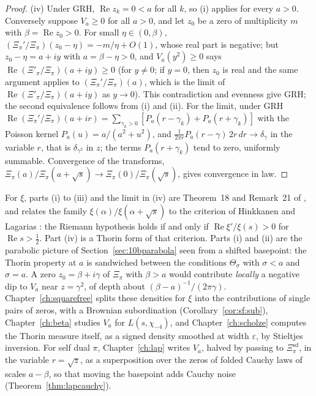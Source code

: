 \begin{proof}
(iv) Under GRH, $\operatorname{Re}z_k = 0<a$ for all $k$, so (i) applies for every $a>0$. Conversely suppose $V_a\ge0$ for all $a>0$, and let $z_0$ be a zero of multiplicity $m$ with $\beta = \operatorname{Re}z_0>0$. For small $\eta\in(0,\beta)$, $(\Xi_\pi'/\Xi_\pi)(z_0-\eta) = -m/\eta+O(1)$, whose real part is negative; but $z_0-\eta = a+iy$ with $a = \beta-\eta>0$, and $V_a(y^2)\ge0$ says $\operatorname{Re}(\Xi'_\pi/\Xi_\pi)(a+iy)\ge0$ (for $y\ne0$; if $y=0$, then $z_0$ is real and the same argument applies to $(\Xi_\pi'/\Xi_\pi)(a)$, which is the limit of $\operatorname{Re}(\Xi'_\pi/\Xi_\pi)(a+iy)$ as $y\to0$). This contradiction and evenness give GRH; the second equivalence follows from (i) and (ii). For the limit, under GRH $\operatorname{Re}(\Xi_\pi'/\Xi_\pi)(a+ir) = \sum_{\gamma_k>0}[P_a(r-\gamma_k)+P_a(r+\gamma_k)]$ with the Poisson kernel $P_a(u) = a/(a^2+u^2)$, and $\frac1{2\pi r}P_a(r-\gamma)\,2r\,dr\to\delta_\gamma$ in the variable $r$, that is $\delta_{\gamma^2}$ in $z$; the terms $P_a(r+\gamma_k)$ tend to zero, uniformly summable. Convergence of the transforms, $\Xi_\pi(a)/\Xi_\pi(a+\sqrt s)\to\Xi_\pi(0)/\Xi_\pi(\sqrt s)$, gives convergence in law.
\end{proof}

For $\xi$, parts (i) to (iii) and the limit in (iv) are Theorem~18 and Remark~21 of \cite{polson2018vdp}, and \cite{polson2017} relates the family $\xi(\alpha)/\xi(\alpha+\sqrt s)$ to the criterion of Hinkkanen \cite{hinkkanen1997} and Lagarias \cite{lagarias1999}: the Riemann hypothesis holds if and only if $\operatorname{Re}\xi'/\xi(s)>0$ for $\operatorname{Re}s>\frac12$. Part (iv) is a Thorin form of that criterion. Parts (i) and (ii) are the parabolic picture of Section~\ref{sec:10bparabola} seen from a shifted basepoint: the Thorin property at $a$ is sandwiched between the conditions $\Theta_\sigma$ with $\sigma<a$ and $\sigma = a$. A zero $z_0 = \beta+i\gamma$ of $\Xi_\pi$ with $\beta>a$ would contribute \emph{locally} a negative dip to $V_a$ near $z = \gamma^2$, of depth about $(\beta-a)^{-1}/(2\pi\gamma)$. Chapter~\ref{ch:squarefree} splits these densities for $\xi$ into the contributions of single pairs of zeros, with a Brownian subordination (Corollary~\ref{cor:sf:sub}), Chapter~\ref{ch:beta} studies $V_a$ for $L(s,\chi_{-4})$, and Chapter~\ref{ch:scholze} computes the Thorin measure itself, as a signed density smoothed at width $\varepsilon$, by Stieltjes inversion. For self dual $\pi$, Chapter~\ref{ch:lap} writes $V_a$, halved by passing to $\Xi^{\mathrm{sd}}_\pi$, in the variable $r=\sqrt z$, as a superposition over the zeros of folded Cauchy laws of scales $a-\beta$, so that moving the basepoint adds Cauchy noise (Theorem~\ref{thm:lapcauchy}).

